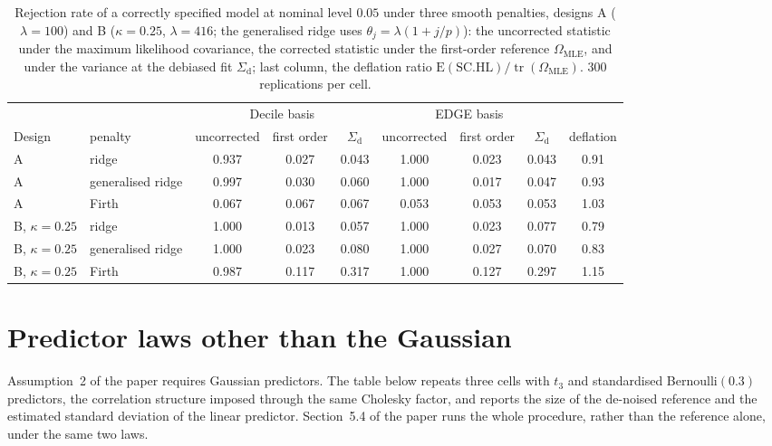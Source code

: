 \documentclass[namedate,webpdf,modern,mediumone]{oup-authoring-template}
\DeclareMathOperator{\tr}{tr}
\newcommand{\Om}{\Omega}
\begin{document}
\begin{table}[!t]
\centering
\small
\caption{Rejection rate of a correctly specified model at nominal level $0.05$ under three smooth penalties, designs A ($\lambda = 100$) and B ($\kappa = 0.25$, $\lambda = 416$; the generalised ridge uses $\theta_j = \lambda(1 + j/p)$): the uncorrected statistic under the maximum likelihood covariance, the corrected statistic under the first-order reference $\Om_{\mathrm{MLE}}$, and under the variance at the debiased fit $\Sigma_{\mathrm{d}}$; last column, the deflation ratio $\mathrm{E}(\mathrm{SC.HL})/\tr(\Om_{\mathrm{MLE}})$. $300$ replications per cell.}
\label{tab:suppenalty}
\begin{tabular}{llccccccc}
\toprule
& & \multicolumn{3}{c}{Decile basis} & \multicolumn{3}{c}{EDGE basis} & \\
\cmidrule(lr){3-5}\cmidrule(lr){6-8}
Design & penalty & uncorrected & first order & $\Sigma_{\mathrm{d}}$ & uncorrected & first order & $\Sigma_{\mathrm{d}}$ & deflation \\
\midrule
A & ridge & 0.937 & 0.027 & 0.043 & 1.000 & 0.023 & 0.043 & 0.91 \\
A & generalised ridge & 0.997 & 0.030 & 0.060 & 1.000 & 0.017 & 0.047 & 0.93 \\
A & Firth & 0.067 & 0.067 & 0.067 & 0.053 & 0.053 & 0.053 & 1.03 \\
\addlinespace
B, $\kappa = 0.25$ & ridge & 1.000 & 0.013 & 0.057 & 1.000 & 0.023 & 0.077 & 0.79 \\
B, $\kappa = 0.25$ & generalised ridge & 1.000 & 0.023 & 0.080 & 1.000 & 0.027 & 0.070 & 0.83 \\
B, $\kappa = 0.25$ & Firth & 0.987 & 0.117 & 0.317 & 1.000 & 0.127 & 0.297 & 1.15 \\
\bottomrule
\end{tabular}
\end{table}


\section{Predictor laws other than the Gaussian}\label{sup:law}

Assumption~2 of the paper requires Gaussian predictors. The table below repeats three cells
with $t_3$ and standardised Bernoulli$(0.3)$ predictors, the correlation structure imposed
through the same Cholesky factor, and reports the size of the de-noised reference and the
estimated standard deviation of the linear predictor. Section~5.4 of the paper runs the whole
procedure, rather than the reference alone, under the same two laws.
\end{document}

